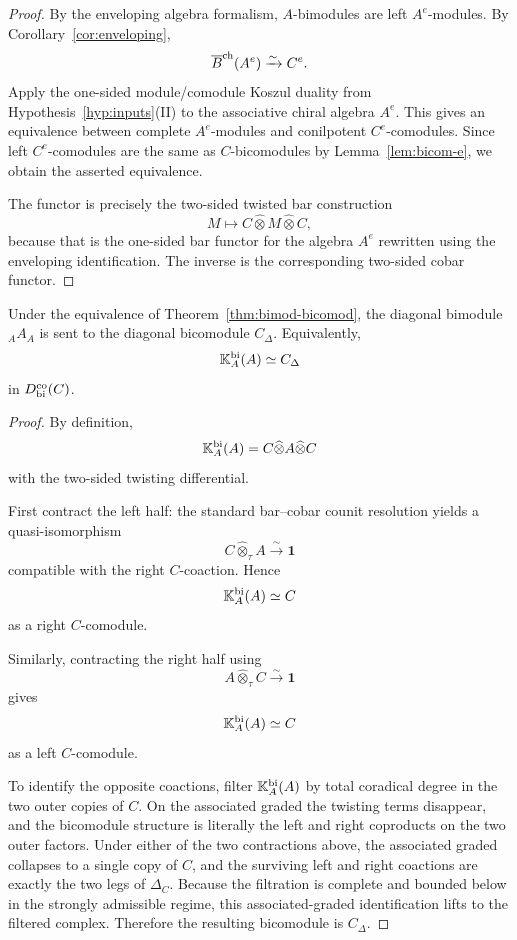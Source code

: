 \begin{proof}
By the enveloping algebra formalism, $A$-bimodules are left $A^e$-modules.
By Corollary~\ref{cor:enveloping},
\[
\overline{B}^{\mathrm{ch}}(A^e)\xrightarrow{\sim} C^e.
\]
Apply the one-sided module/comodule Koszul duality from Hypothesis~\ref{hyp:inputs}(II) to the
associative chiral algebra $A^e$. This gives an equivalence between complete $A^e$-modules and
conilpotent $C^e$-comodules. Since left $C^e$-comodules are the same as $C$-bicomodules by
Lemma~\ref{lem:bicom-e}, we obtain the asserted equivalence.

The functor is precisely the two-sided twisted bar construction
\[
M\longmapsto C\widehat\otimes M\widehat\otimes C,
\]
because that is the one-sided bar functor for the algebra $A^e$ rewritten using the enveloping
identification. The inverse is the corresponding two-sided cobar functor.
\end{proof}

\begin{theorem}
\label{thm:diagonal}
Under the equivalence of Theorem~\ref{thm:bimod-bicomod}, the diagonal bimodule ${}_A A_A$ is sent
to the diagonal bicomodule $C_\Delta$. Equivalently,
\[
\mathbb{K}_A^{\mathrm{bi}}(A)\simeq C_\Delta
\]
in $D^{\mathrm{co}}_{\mathrm{bi}}(C)$.
\end{theorem}

\begin{proof}
By definition,
\[
\mathbb{K}_A^{\mathrm{bi}}(A)=C\widehat\otimes A\widehat\otimes C
\]
with the two-sided twisting differential.

First contract the left half:
the standard bar--cobar counit resolution yields a quasi-isomorphism
\[
C\widehat\otimes_\tau A\xrightarrow{\sim} \mathbf 1
\]
compatible with the right $C$-coaction. Hence
\[
\mathbb{K}_A^{\mathrm{bi}}(A)\simeq C
\]
as a right $C$-comodule.

Similarly, contracting the right half using
\[
A\widehat\otimes_\tau C\xrightarrow{\sim}\mathbf 1
\]
gives
\[
\mathbb{K}_A^{\mathrm{bi}}(A)\simeq C
\]
as a left $C$-comodule.

To identify the opposite coactions, filter $\mathbb{K}_A^{\mathrm{bi}}(A)$ by total coradical degree in the
two outer copies of $C$. On the associated graded the twisting terms disappear, and the bicomodule
structure is literally the left and right coproducts on the two outer factors. Under either of the
two contractions above, the associated graded collapses to a single copy of $C$, and the surviving
left and right coactions are exactly the two legs of $\Delta_C$. Because the filtration is complete
and bounded below in the strongly admissible regime, this associated-graded identification lifts to
the filtered complex. Therefore the resulting bicomodule is $C_\Delta$.
\end{proof}

